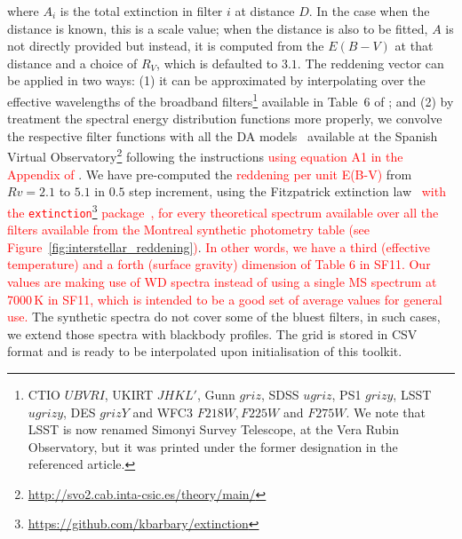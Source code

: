 \documentclass[fleqn,usenatbib]{rasti}
\begin{document}
where $A_i$ is the total extinction in filter $i$ at distance $D$. In the case
when the distance is known, this is a scale value; when the distance is also
to be fitted, $A$ is not directly provided but instead, it is computed from the
$E(B-V)$ at that distance and a choice of $R_{V}$, which is defaulted to $3.1$.
The reddening vector can be applied in two ways: (1) it can be approximated by
interpolating over the effective wavelengths of the broadband
filters\footnote{CTIO $UBVRI$, UKIRT $JHKL'$, Gunn $griz$, SDSS $ugriz$,
PS1 $grizy$, LSST $ugrizy$, DES $grizY$ and WFC3 $F218W, F225W$ and $F275W$.
We note that LSST is now renamed Simonyi Survey Telescope, at the Vera Rubin
Observatory, but it was printed under the former designation in the referenced
article.} available in Table~6 of \citet{2011ApJ...737..103S}; and (2) by
treatment the spectral energy distribution functions more properly, we convolve
the respective filter functions with all the DA
models~\citep{2009ApJ...696.1755T, 2010MmSAI..81..921K} available at the
Spanish Virtual
Observatory\footnote{\url{http://svo2.cab.inta-csic.es/theory/main/}} following
the instructions  \textcolor{red}{using equation A1 in the Appendix of} \citet[][SF11]{2011ApJ...737..103S}. We have pre-computed the
\textcolor{red}{reddening per unit E(B-V)} from $Rv = 2.1$ to $5.1$ in $0.5$ step increment, using the
Fitzpatrick extinction law~\citep{1999PASP..111...63F} \textcolor{red}{with the
\texttt{extinction}\footnote{\url{https://github.com/kbarbary/extinction}}
package~\citep{2016zndo....804967B}, for every theoretical
spectrum available over all the filters available from the Montreal synthetic
photometry table (see Figure~\ref{fig:interstellar_reddening})}.
\textcolor{red}{In other words, we have a third (effective temperature) and a forth (surface gravity) dimension
of Table 6 in SF11. Our values are making use of WD spectra instead of using a single MS spectrum at 7000\,K in SF11, which is intended to be a good set of average values for general use.}
The synthetic
spectra do not cover some of the bluest filters, in such cases, we extend
those spectra with blackbody profiles. The grid is stored in CSV format and
is ready to be interpolated upon initialisation of this toolkit.
\end{document}
